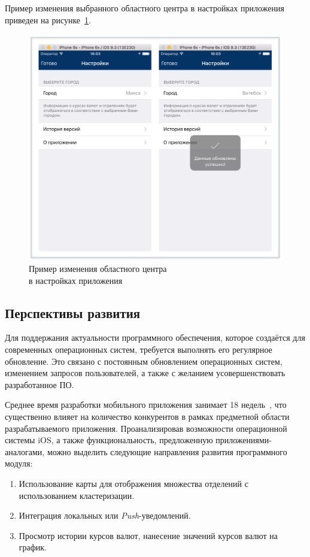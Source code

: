 Пример изменения выбранного областного центра в настройках приложения приведен
на рисунке~\ref{fig:settings_manual}.
\begin{figure}[h!]
  \centering
  \includegraphics[width=130mm]{fig/settings_manual}
  \caption{Пример изменения областного центра \\ в настройках приложения}
  \label{fig:settings_manual}
\end{figure}

\pagebreak



\subsection{Перспективы развития}

Для поддержания актуальности программного обеспечения, которое
создаётся для современных операционных систем, требуется выполнять его
регулярное обновление. Это связано с постоянным обновлением операционных систем,
изменением запросов пользователей, а также с желанием усовершенствовать
разработанное ПО.

Среднее время разработки мобильного приложения занимает 18
недель~\cite{time_to_develop_mobile_app}, что существенно влияет
на количество конкурентов в рамках предметной области разрабатываемого приложения.
Проанализировав возможности операционной системы iOS, а также функциональность,
предложенную приложениями-аналогами, можно выделить следующие направления развития
программного модуля:
\begin{enumerate}
  \item Использование карты для отображения множества отделений с использованием
    кластеризации.
  \item Интеграция локальных или \textit{Push}-уведомлений.
  \item Просмотр истории курсов валют, нанесение значений курсов валют на график.
\end{enumerate}

